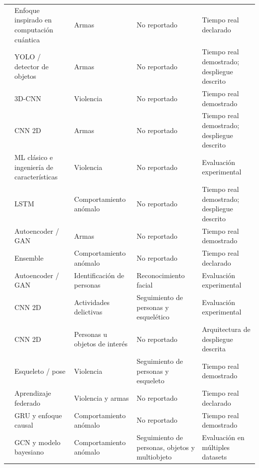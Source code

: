 \documentclass[pdflatex,sn-mathphys-num]{sn-jnl}%
\theoremstyle{thmstyleone}%
\theoremstyle{thmstyletwo}%
\theoremstyle{thmstylethree}%
\begin{document}
\begin{longtable}{@{}L{2.0cm}L{2.5cm}L{2.55cm}L{2.4cm}L{2.9cm}@{}}
\citet{shah2025} &
Enfoque inspirado en computación cuántica &
Armas &
No reportado &
Tiempo real declarado \\

\citet{silva2026} &
YOLO / detector de objetos &
Armas &
No reportado &
Tiempo real demostrado; despliegue descrito \\

\citet{park2024} &
3D-CNN &
Violencia &
No reportado &
Tiempo real demostrado \\

\citet{pereatrigo2023} &
CNN 2D &
Armas &
No reportado &
Tiempo real demostrado; despliegue descrito \\

\citet{donia2023} &
ML clásico e ingeniería de características &
Violencia &
No reportado &
Evaluación experimental \\

\citet{azam2026} &
LSTM &
Comportamiento anómalo &
No reportado &
Tiempo real demostrado; despliegue descrito \\

\citet{singh2026} &
Autoencoder / GAN &
Armas &
No reportado &
Tiempo real demostrado \\

\citet{jokhio2024} &
Ensemble &
Comportamiento anómalo &
No reportado &
Tiempo real declarado \\

\citet{sandhya2022} &
Autoencoder / GAN &
Identificación de personas &
Reconocimiento facial &
Evaluación experimental \\

\citet{matei2025} &
CNN 2D &
Actividades delictivas &
Seguimiento de personas y esquelético &
Evaluación experimental \\

\citet{lin2025} &
CNN 2D &
Personas u objetos de interés &
No reportado &
Arquitectura de despliegue descrita \\

\citet{garciacobo2023} &
Esqueleto / pose &
Violencia &
Seguimiento de personas y esqueleto &
Tiempo real demostrado \\

\citet{tonmoy2025} &
Aprendizaje federado &
Violencia y armas &
No reportado &
Tiempo real declarado \\

\citet{gao2026} &
GRU y enfoque causal &
Comportamiento anómalo &
No reportado &
Tiempo real demostrado \\

\citet{leyva2024} &
GCN y modelo bayesiano &
Comportamiento anómalo &
Seguimiento de personas, objetos y multiobjeto &
Evaluación en múltiples datasets \\

\end{longtable}
\end{document}
